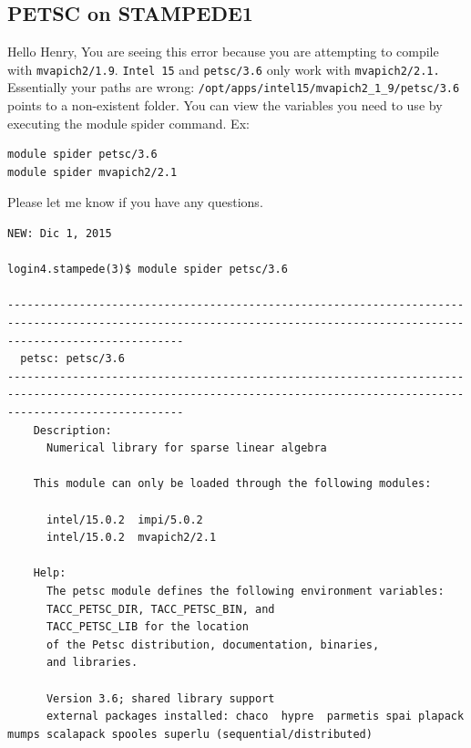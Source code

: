 \documentclass{article}
\begin{document}
\subsection{PETSC on STAMPEDE1}
Hello Henry,
You are seeing this error because you are attempting to compile with \verb+mvapich2/1.9+. \verb+Intel 15+ and \verb+petsc/3.6+ only work with \verb+mvapich2/2.1.+ 
Essentially your paths are wrong: \verb+/opt/apps/intel15/mvapich2_1_9/petsc/3.6+ points to a non-existent folder. You can view the variables you need to use by executing the module spider command.
Ex:
\scriptsize
\begin{verbatim}
module spider petsc/3.6
module spider mvapich2/2.1
\end{verbatim}
\normalsize
Please let me know if you have any questions.
\scriptsize
\begin{verbatim}
NEW: Dic 1, 2015

login4.stampede(3)$ module spider petsc/3.6

-----------------------------------------------------------------------------------------------------------------------------------------------------------------------
  petsc: petsc/3.6
-----------------------------------------------------------------------------------------------------------------------------------------------------------------------
    Description:
      Numerical library for sparse linear algebra

    This module can only be loaded through the following modules:

      intel/15.0.2  impi/5.0.2
      intel/15.0.2  mvapich2/2.1
 
    Help:
      The petsc module defines the following environment variables:
      TACC_PETSC_DIR, TACC_PETSC_BIN, and
      TACC_PETSC_LIB for the location
      of the Petsc distribution, documentation, binaries,
      and libraries.
      
      Version 3.6; shared library support
      external packages installed: chaco  hypre  parmetis spai plapack mumps scalapack spooles superlu (sequential/distributed)
\end{verbatim}
\normalsize
\scriptsize
\end{document}
